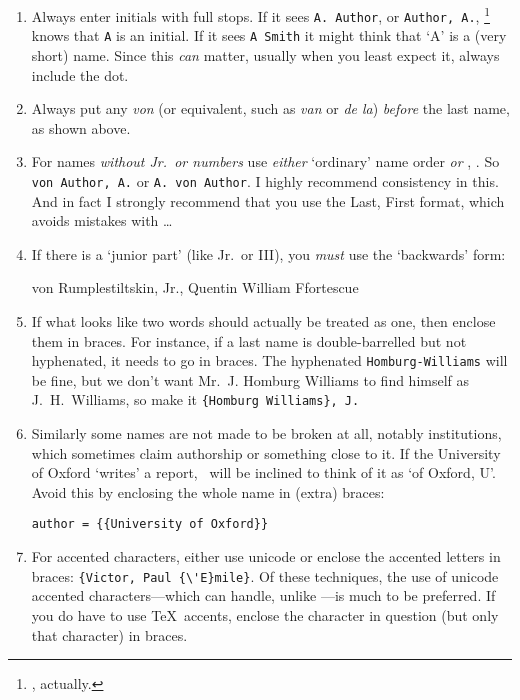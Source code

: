 {\begin{enumerate}
\item Always enter initials with full stops. If it sees
  \verb|A. Author|, or \verb|Author, A.|,
  \biblatex\footnote{, actually.} knows that \verb|A|
  is an initial. If it sees \verb|A Smith| it might think that `A' is
  a (very short) name. Since this \emph{can} matter, usually when you
  least expect it, always include the dot.
\item Always put any \emph{von} (or equivalent, such as \emph{van} or
  \emph{de la}) \emph{before} the last name, as shown above.
\item For names \emph{without Jr.\ or numbers} use \emph{either}
  `ordinary' name order \emph{or} , . So \verb|von Author, A.| or
  \verb|A. von Author|. I highly recommend consistency in this. And in
  fact I strongly recommend that you use the Last, First format, which
  avoids mistakes with \ldots
\item If there is a `junior part' (like Jr.\ or III), you \emph{must}
  use the `backwards' form:\begin{center}von Rumplestiltskin, Jr.,
    Quentin William Ffortescue\end{center}
\item If what looks like two words should actually be treated as one,
  then enclose them in braces. For instance, if a last name is
  double-barrelled but not hyphenated, it needs to go in braces. The
  hyphenated \verb|Homburg-Williams| will be fine, but we don't want
  Mr.\ J. Homburg Williams to find himself as J.\ H.~Williams, so make
  it \verb|{Homburg Williams}, J.|
\item Similarly some names are not made to be broken at all, notably
  institutions, which sometimes claim authorship or something close to
  it. If the University of Oxford `writes' a report, \biblatex\ will
  be inclined to think of it as `of Oxford, U'. Avoid this by
  enclosing the whole name in (extra) braces:
\begin{center}
\verb|author = {{University of Oxford}}|
\end{center}
\item For accented characters, either use unicode or enclose the
  accented letters in braces: \verb|{Victor, Paul {\'E}mile}|. Of
  these techniques, the use of unicode accented characters---which
   can handle, unlike \bibtex---is much to be
  preferred. If you do have to use \TeX\ accents, enclose the
  character in question (but only that character) in braces.
\end{enumerate} 

}

